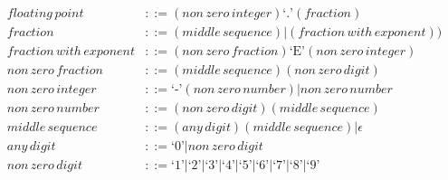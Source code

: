 \documentclass{article}
\begin{document}
\begin{align*}
    floating\,point &::= (non\,zero\,integer) \text{`.'} (fraction) \\
    fraction &::= (middle\,sequence) | (fraction\,with\,exponent))\\
    fraction\,with\,exponent &::= (non\,zero\,fraction) \text{`E'} (non\,zero\,integer)\\
    non\,zero\,fraction &::= (middle\,sequence)(non\,zero\,digit)\\
    non\,zero\,integer &::=  \text{`-'} (non\,zero\,number) | non\,zero\,number\\
    non\,zero\,number &::= (non\,zero\,digit)(middle\,sequence)\\
    middle\,sequence &::= (any\,digit)(middle\,sequence) | \epsilon\\
    any\,digit &::= \text{`0'} | non\,zero\,digit\\
    non\,zero\,digit &::= \text{`1'} | \text{`2'} | \text{`3'} | \text{`4'} |
                          \text{`5'} | \text{`6'} | \text{`7'} | \text{`8'} | \text{`9'}\\
\end{align*}
\end{document}
